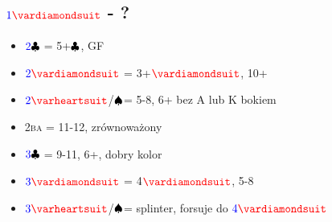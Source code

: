 \documentclass[12pt]{article}
\newcommand*\Hs[1][]{\ensuremath{{\color{blue} #1}{\color{red}\varheartsuit}}}
\newcommand*\Ss[1][]{\ensuremath{{\color{blue} #1}{\color{black}\spadesuit}}}
\newcommand*\Ds[1][]{\ensuremath{{\color{blue} #1}{\color{red}\vardiamondsuit}}}
\newcommand*\Cs[1][]{\ensuremath{{\color{blue} #1}{\color{black}\clubsuit}}}
\newcommand*\NT[1][]{{\color{blue} #1}{\color{black}\textsc{ba}}}
\begin{document}
\subsection{\Ds[1] - ?}
\begin{itemize}
    \item \Cs[2] = 5+\Cs, GF
    \item \Ds[2] = 3+\Ds, 10+
    \item \Hs[2]/\Ss = 5-8, 6+ bez A lub K bokiem
    \item \NT[2] = 11-12, zrównoważony
    \item \Cs[3] = 9-11, 6+, dobry kolor
    \item \Ds[3] = 4\Ds, 5-8
    \item \Hs[3]/\Ss = splinter, forsuje do \Ds[4]
\end{itemize}
\end{document}
